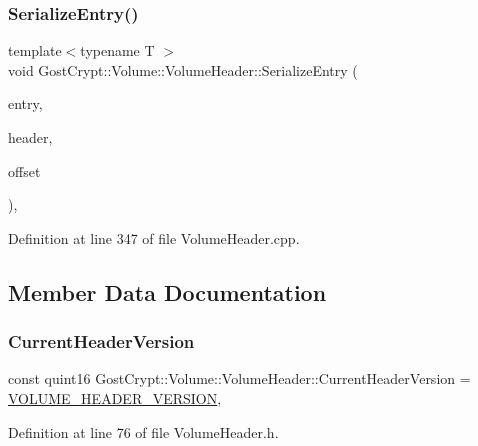 \subsubsection{\texorpdfstring{Serialize\+Entry()}{SerializeEntry()}}
{\footnotesize\ttfamily template$<$typename T $>$ \\
void Gost\+Crypt\+::\+Volume\+::\+Volume\+Header\+::\+Serialize\+Entry (\begin{DoxyParamCaption}\item[{const \hyperlink{_stribog_8c_aba2f4c400d7a4c0bf0296be622087314}{T} \&}]{entry,  }\item[{\hyperlink{class_gost_crypt_1_1_buffer_ptr}{Buffer\+Ptr} \&}]{header,  }\item[{size\+\_\+t \&}]{offset }\end{DoxyParamCaption})\hspace{0.3cm}{\ttfamily [static]}, {\ttfamily [protected]}}



Definition at line 347 of file Volume\+Header.\+cpp.



\subsection{Member Data Documentation}
\mbox{\label{class_gost_crypt_1_1_volume_1_1_volume_header_a89260a77af653fb9b99e0fc31a12da62}} 
\subsubsection{\texorpdfstring{Current\+Header\+Version}{CurrentHeaderVersion}}
{\footnotesize\ttfamily const quint16 Gost\+Crypt\+::\+Volume\+::\+Volume\+Header\+::\+Current\+Header\+Version = \hyperlink{_volumes_8h_afc0155db6ffb15c5f34f923bf75ab0e8}{V\+O\+L\+U\+M\+E\+\_\+\+H\+E\+A\+D\+E\+R\+\_\+\+V\+E\+R\+S\+I\+ON}\hspace{0.3cm}{\ttfamily [static]}, {\ttfamily [protected]}}



Definition at line 76 of file Volume\+Header.\+h.

